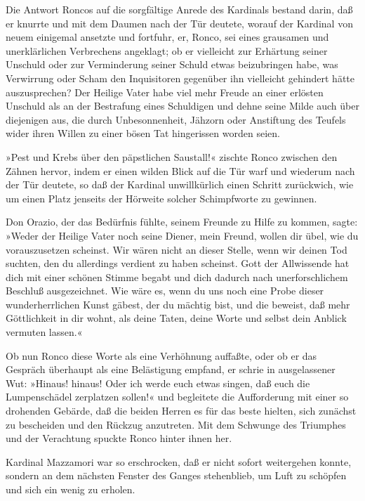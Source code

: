 \pagenum{[69]}Die Antwort Roncos auf die sorgfältige Anrede des
Kardinals bestand darin, daß er knurrte und mit dem Daumen nach der
Tür deutete, worauf der Kardinal von neuem einigemal ansetzte und
fortfuhr, er, Ronco, sei eines grausamen und unerklärlichen
Verbrechens angeklagt; ob er vielleicht zur Erhärtung seiner
Unschuld oder zur Verminderung seiner Schuld etwas beizubringen
habe, was Verwirrung oder Scham den Inquisitoren gegenüber ihn
vielleicht gehindert hätte auszusprechen? Der Heilige Vater habe
viel mehr Freude an einer erlösten Unschuld als an der Bestrafung
eines Schuldigen und dehne seine Milde auch über diejenigen aus,
die durch Unbesonnenheit, Jähzorn oder Anstiftung des Teufels wider
ihren Willen zu einer bösen Tat hingerissen worden seien.

»Pest und Krebs über den päpstlichen Saustall!« zischte Ronco
zwischen den Zähnen hervor, indem er einen wilden Blick auf die Tür
warf und wiederum nach der Tür deutete, so daß der Kardinal
unwillkürlich einen Schritt zurückwich, wie um einen Platz jenseits
der Hörweite solcher Schimpfworte zu gewinnen.

Don Orazio, der das Bedürfnis fühlte, seinem Freunde zu Hilfe zu
kommen, sagte: »Weder der Heilige Vater noch seine Diener, mein
Freund, wollen dir übel, wie du vorauszusetzen scheinst. Wir wären
nicht an dieser Stelle, wenn wir deinen Tod suchten, den du
allerdings verdient zu haben scheinst. Gott der Allwissende hat
dich mit einer schönen Stimme begabt und dich dadurch nach
unerforschlichem Beschluß ausgezeichnet. Wie wäre es, wenn du uns
noch eine Probe dieser wunderherrlichen Kunst gäbest, der du
mächtig bist, und die beweist, daß mehr Göttlichkeit in dir wohnt,
als deine Taten, deine Worte und selbst dein Anblick vermuten
lassen.«

\pagenum{[70]}Ob nun Ronco diese Worte als eine Verhöhnung
auffaßte, oder ob er das Gespräch überhaupt als eine Belästigung
empfand, er schrie in ausgelassener Wut: »Hinaus! hinaus! Oder ich
werde euch etwas singen, daß euch die Lumpenschädel zerplatzen
sollen!« und begleitete die Aufforderung mit einer so drohenden
Gebärde, daß die beiden Herren es für das beste hielten, sich
zunächst zu bescheiden und den Rückzug anzutreten. Mit dem Schwunge
des Triumphes und der Verachtung spuckte Ronco hinter ihnen her.

Kardinal Mazzamori war so erschrocken, daß er nicht sofort
weitergehen konnte, sondern an dem nächsten Fenster des Ganges
stehenblieb, um Luft zu schöpfen und sich ein wenig zu erholen.

